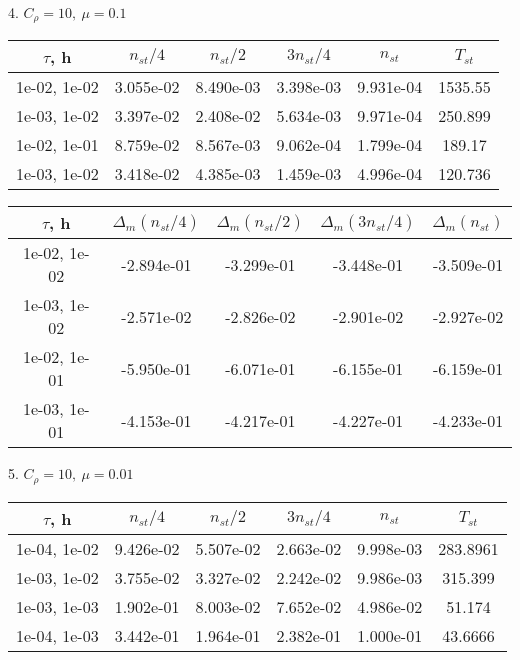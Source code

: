 4. $C_{\rho} = 10, \ \mu = 0.1$
\begin{center}
	\begin{tabular}{ |c|c|c|c|c|c| } 
		\hline
		$\tau$, h & $n_{st}/ 4$ & $n_{st}/ 2$ & $3n_{st}/ 4$ & $n_{st}$ & $T_{st}$ \\ 
		\hline
		1e-02, 1e-02 & 3.055e-02 & 8.490e-03 & 3.398e-03 & 9.931e-04 & 1535.55\\ 
		\hline
		1e-03, 1e-02 & 3.397e-02 & 2.408e-02 & 5.634e-03 & 9.971e-04 & 250.899\\ 
		\hline
		1e-02, 1e-01 & 8.759e-02 & 8.567e-03 & 9.062e-04 & 1.799e-04 & 189.17\\ 
		\hline
		1e-03, 1e-02 & 3.418e-02 & 4.385e-03 & 1.459e-03 & 4.996e-04 & 120.736\\ 
		\hline
	\end{tabular}
\end{center}

\begin{center}
	\begin{tabular}{ |c|c|c|c|c| } 
		\hline
		$\tau$, h & $\Delta_m (n_{st}/ 4)$ & $\Delta_m (n_{st}/ 2)$ & $\Delta_m (3n_{st}/ 4)$ & $\Delta_m (n_{st})$ \\ 
		\hline
		1e-02, 1e-02 & -2.894e-01 & -3.299e-01 & -3.448e-01 & -3.509e-01 \\ 
		\hline
		1e-03, 1e-02 & -2.571e-02 & -2.826e-02 & -2.901e-02 & -2.927e-02 \\ 
		\hline
		1e-02, 1e-01 & -5.950e-01 & -6.071e-01 & -6.155e-01 & -6.159e-01 \\ 
		\hline
		1e-03, 1e-01 & -4.153e-01 & -4.217e-01 & -4.227e-01 & -4.233e-01 \\ 
		\hline
	\end{tabular}
\end{center}

5. $C_{\rho} = 10, \ \mu = 0.01$
\begin{center}
	\begin{tabular}{ |c|c|c|c|c|c| } 
		\hline
		$\tau$, h & $n_{st}/ 4$ & $n_{st}/ 2$ & $3n_{st}/ 4$ & $n_{st}$ & $T_{st}$ \\ 
		\hline
		1e-04, 1e-02 & 9.426e-02 & 5.507e-02 & 2.663e-02 & 9.998e-03 & 283.8961\\ 
		\hline
		1e-03, 1e-02 & 3.755e-02 & 3.327e-02 & 2.242e-02 & 9.986e-03 & 315.399\\ 
		\hline
		1e-03, 1e-03 & 1.902e-01 & 8.003e-02 & 7.652e-02 & 4.986e-02 & 51.174\\ 
		\hline
		1e-04, 1e-03 & 3.442e-01 & 1.964e-01 & 2.382e-01 & 1.000e-01 & 43.6666\\ 
		\hline
	\end{tabular}
\end{center}


